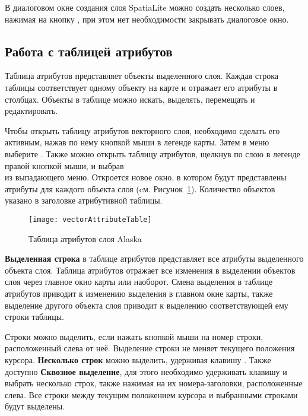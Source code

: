 В диалоговом окне создания слоя SpatiaLite можно создать несколько слоев,
нажимая на кнопку , при этом нет необходимости закрывать
диалоговое окно.

\subsection{Работа с таблицей атрибутов}
\label{sec:attribute table}

Таблица атрибутов представляет объекты выделенного слоя. Каждая строка таблицы
соответствует одному объекту на карте и отражает его атрибуты в столбцах.
Объекты в таблице можно искать, выделять, перемещать и редактировать.

Чтобы открыть таблицу атрибутов векторного слоя, необходимо сделать его активным,
нажав по нему кнопкой мыши в легенде карты. Затем в меню 
выберите .
Также можно открыть таблицу атрибутов, щелкнув по слою в легенде правой
кнопкой мыши, и выбрав \\
из выпадающего меню. Откроется новое окно, в котором будут представлены атрибуты
для каждого объекта слоя (cм. Рисунок~\ref{fig:attributetable}). Количество
объектов указано в заголовке атрибутивной таблицы.

\begin{figure}[ht]
   \centering
   \texttt{[image: vectorAttributeTable]}
   \caption{Таблица атрибутов слоя Alaska \wincaption}\label{fig:attributetable}
\end{figure}


\textbf{Выделенная строка} в таблице атрибутов представляет все атрибуты
выделенного объекта слоя. Таблица атрибутов отражает все изменения в
выделении объектов слоя через главное окно карты или наоборот. Смена
выделения в таблице атрибутов приводит к изменению выделения в главном
окне карты, также выделение другого объекта слоя приводит к выделению
соответствующей ему строки таблицы.

Строки можно выделить, если нажать кнопкой мыши на номер строки, расположенный
слева от неё. Выделение строки не меняет текущего положения курсора.
\textbf{Несколько строк} можно выделить, удерживая клавишу .
Также доступно \textbf{Сквозное выделение}, для этого необходимо
удерживать клавишу  и выбрать несколько строк, также
нажимая на их номера-заголовки, расположенные слева. Все строки между
текущим положением курсора и выбранными строками будут выделены.

